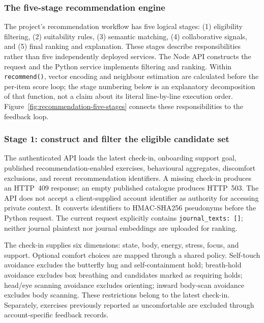 \subsubsection{The five-stage recommendation engine}
\label{sec:five-stages}

The project's recommendation workflow has five logical stages: (1) eligibility filtering, (2) suitability rules, (3) semantic matching, (4) collaborative signals, and (5) final ranking and explanation. These stages describe responsibilities rather than five independently deployed services. The Node API constructs the request and the Python service implements filtering and ranking. Within \texttt{recommend()}, vector encoding and neighbour estimation are calculated before the per-item score loop; the stage numbering below is an explanatory decomposition of that function, not a claim about its literal line-by-line execution order. Figure~\ref{fig:recommendation-five-stages} connects these responsibilities to the feedback loop.

\subsubsection{Stage 1: construct and filter the eligible candidate set}
\label{sec:stage-one}

The authenticated API loads the latest check-in, onboarding support goal, published recommendation-enabled exercises, behavioural aggregates, discomfort exclusions, and recent recommendation identifiers. A missing check-in produces an HTTP~409 response; an empty published catalogue produces HTTP~503. The API does not accept a client-supplied account identifier as authority for accessing private context. It converts identifiers to HMAC-SHA256 pseudonyms before the Python request. The current request explicitly contains \texttt{journal\_texts: []}; neither journal plaintext nor journal embeddings are uploaded for ranking.

The check-in supplies six dimensions: state, body, energy, stress, focus, and support. Optional comfort choices are mapped through a shared policy. Self-touch avoidance excludes the butterfly hug and self-containment hold; breath-hold avoidance excludes box breathing and candidates marked as requiring holds; head/eye scanning avoidance excludes orienting; inward body-scan avoidance excludes body scanning. These restrictions belong to the latest check-in. Separately, exercises previously reported as uncomfortable are excluded through account-specific feedback records.

